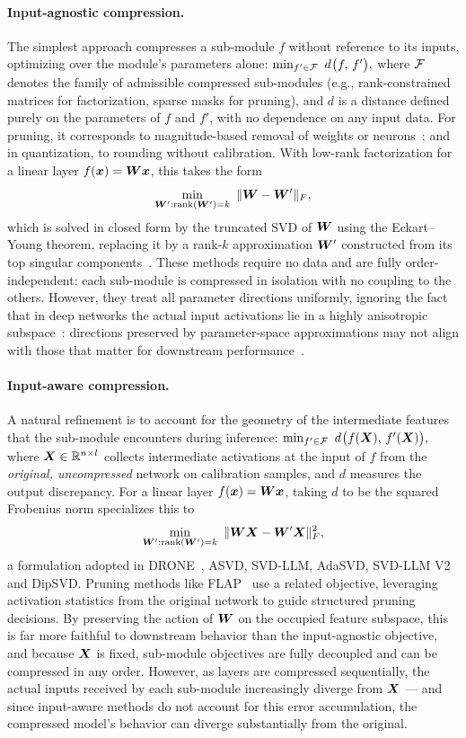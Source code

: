 \documentclass[10pt]{article} %
\theoremstyle{definition}
\theoremstyle{remark}
\begin{document}
\paragraph{Input-agnostic compression.}
The simplest approach compresses a sub-module $f$ without reference to its inputs, optimizing over the module's parameters alone:
$
\min_{f' \in {\mathcal{F}}} \ d \: \!\bigl(f,\, f'\bigr),
$
where ${\mathcal{F}}$ denotes the family of admissible compressed sub-modules (e.g., rank-constrained matrices for factorization, sparse masks for pruning), and $d$ is a distance defined purely on the parameters of $f$ and $f'$, with no dependence on any input data.
For pruning, it corresponds to magnitude-based removal of weights or neurons~\citep{han2015learning}; and in
quantization, to rounding without calibration. With low-rank factorization for a linear layer $f({\bm{x}}) = {\bm{W}}{\bm{x}}$, this takes the form
\[
\min_{{\bm{W}}' : \mathrm{rank}({\bm{W}}') = k} \ \| {\bm{W}} - {\bm{W}}' \|_F,
\]
which is solved in closed form by the truncated SVD of ${\bm{W}}$ using the Eckart--Young theorem,
replacing it by a rank-\(k\) approximation \({\bm{W}}'\) constructed from its top singular
components~\citep{Halko2011RandomizedSVD, sainath2013low}.
These methods require no data and are fully order-independent: each sub-module is compressed in isolation with no coupling to the others.
However, they treat all parameter directions uniformly, ignoring the fact that in deep
networks the actual input activations lie in a highly anisotropic
subspace~\citep{ortiz2020neural}: directions preserved by parameter-space
approximations may not align with those that matter for downstream
performance~\citep{chen2021drone, idelbayev2020low}.


\paragraph{Input-aware compression.}
A natural refinement is to account for the geometry of the intermediate features that the sub-module encounters during inference:
$
\min_{f' \in {\mathcal{F}}} \ d \: \!\bigl(f({\bm{X}}),\, f'({\bm{X}})\bigr),
$
where ${\bm{X}} \in \mathbb{R}^{n \times l}$ collects intermediate activations at the input of $f$ from the \emph{original, uncompressed} network on calibration samples, and $d$ measures the output discrepancy.
For a linear layer $f({\bm{x}}) = {\bm{W}}{\bm{x}}$, taking $d$ to be the squared Frobenius norm specializes this to
\[
\min_{{\bm{W}}' : \mathrm{rank}({\bm{W}}') = k} \ \| {\bm{W}} {\bm{X}} - {\bm{W}}' {\bm{X}} \|_F^2,
\]
a formulation adopted in DRONE~\citep{chen2021drone}, ASVD, SVD-LLM, AdaSVD, SVD-LLM V2 and DipSVD. Pruning methods like FLAP~\citep{an2024fluctuation} use a related objective, leveraging activation statistics from the original network to guide structured pruning decisions.
By preserving the action of ${\bm{W}}$ on the occupied feature subspace, this is far more faithful to downstream behavior than the input-agnostic objective, and because ${\bm{X}}$ is fixed, sub-module objectives are fully decoupled and can be compressed in any order.
However, as layers are compressed sequentially, the actual inputs received by each sub-module increasingly diverge from ${\bm{X}}$ --- and since input-aware methods do not account for this error accumulation, the compressed model's behavior can diverge substantially from the original.
\end{document}
